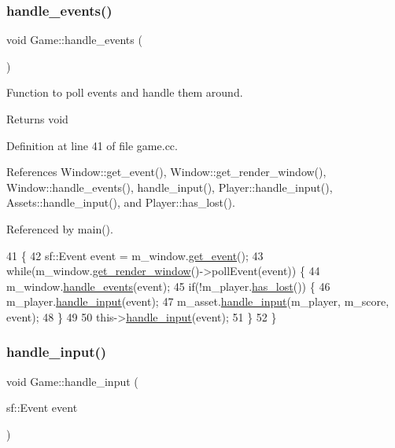\subsubsection{\texorpdfstring{handle\+\_\+events()}{handle\_events()}}
{\footnotesize\ttfamily void Game\+::handle\+\_\+events (\begin{DoxyParamCaption}{ }\end{DoxyParamCaption})}



Function to poll events and handle them around. 

\begin{DoxyReturn}{Returns}
void 
\end{DoxyReturn}


Definition at line 41 of file game.\+cc.



References Window\+::get\+\_\+event(), Window\+::get\+\_\+render\+\_\+window(), Window\+::handle\+\_\+events(), handle\+\_\+input(), Player\+::handle\+\_\+input(), Assets\+::handle\+\_\+input(), and Player\+::has\+\_\+lost().



Referenced by main().


\begin{DoxyCode}
41                          \{
42     sf::Event \textcolor{keyword}{event} = m\_window.\hyperlink{class_window_a878ba53cecdd324dd80274caa0c98a7c}{get\_event}();
43     \textcolor{keywordflow}{while}(m\_window.\hyperlink{class_window_ae921197766adfddd372dcc40879f8b45}{get\_render\_window}()->pollEvent(event)) \{
44         m\_window.\hyperlink{class_window_ae7c221f904b304e507339e6e25ccd018}{handle\_events}(event);
45         \textcolor{keywordflow}{if}(!m\_player.\hyperlink{class_player_a734ead9fd1aa89c2574310425da18dc7}{has\_lost}()) \{
46             m\_player.\hyperlink{class_player_a2a56f0d2037a44c56934c4faac06f54d}{handle\_input}(event);
47             m\_asset.\hyperlink{class_assets_aab62425b0c76418a434cccac038821c4}{handle\_input}(m\_player, m\_score, event);
48         \}
49         
50         this->\hyperlink{class_game_af7895911bb1509fbb33cc1b979c852b8}{handle\_input}(event);
51     \}
52 \}
\end{DoxyCode}
\mbox{\label{class_game_af7895911bb1509fbb33cc1b979c852b8}} 
\subsubsection{\texorpdfstring{handle\+\_\+input()}{handle\_input()}}
{\footnotesize\ttfamily void Game\+::handle\+\_\+input (\begin{DoxyParamCaption}\item[{sf\+::\+Event}]{event }\end{DoxyParamCaption})}




